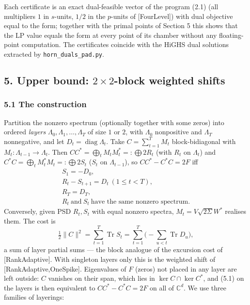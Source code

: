 \documentclass[
  11pt,
  a4paper,
]{article}
\begin{document}
Each certificate is an exact dual-feasible vector of the program (2.1)
(all multipliers \(1\) in \(s\)-units, \(1/2\) in the \(p\)-units of
{[}FourLevel{]}) with dual objective equal to the form; together with
the primal points of Section 5 this shows that the LP value equals the
form at every point of its chamber without any floating-point
computation. The certificates coincide with the HiGHS dual solutions
extracted by {\small\texttt{horn\_\allowbreak{}duals\_\allowbreak{}pad.\allowbreak{}py}}.

\subsection{\texorpdfstring{5. Upper bound: \(2\times2\)-block weighted
shifts}{5. Upper bound: 2\textbackslash times2-block weighted shifts}}\label{upper-bound-2times2-block-weighted-shifts}

\subsubsection{5.1 The construction}\label{the-construction}

Partition the nonzero spectrum (optionally together with some zeros)
into ordered \emph{layers} \(\Lambda_0,\allowbreak{}\Lambda_1,\allowbreak{}\dots,\allowbreak{}\Lambda_T\) of
size \(1\) or \(2\), with \(\Lambda_0\) nonpositive and \(\Lambda_T\)
nonnegative, and let \(D_t=\operatorname{diag}\Lambda_t\). Take
\(C=\sum_{t=1}^TM_t\) block-bidiagonal with
\(M_t:\Lambda_{t-1}\to\Lambda_t\). Then
\(CC^*=\bigoplus_tM_tM_t^*=:\bigoplus 2R_t\) (with \(R_t\) on
\(\Lambda_t\)) and \(C^*C=\bigoplus_tM_t^*M_t=:\bigoplus 2S_t\) (\(S_t\)
on \(\Lambda_{t-1}\)), so \(CC^*-C^*C=2F\) iff
\[\begin{gathered}S_1=-D_0,\\  R_t-S_{t+1}=D_t\ (1\le t<T),\\  R_T=D_T,\\  R_t\ \text{and}\ S_t\ \text{have the same nonzero spectrum}.\end{gathered}\tag{5.1}\]
Conversely, given PSD \(R_t,\allowbreak{}S_t\) with equal nonzero spectra,
\(M_t=V\sqrt{2\Sigma}W^*\) realises them. The cost is
\[\tfrac12\|C\|^2=\sum_{t=1}^T\operatorname{Tr}S_t=\sum_{t=1}^T\Big(-\sum_{u<t}\operatorname{Tr}D_u\Big),\]
a sum of layer partial sums --- the block analogue of the excursion cost
of {[}RankAdaptive{]}. With singleton layers only this is the weighted
shift of {[}RankAdaptive,OneSpike{]}. Eigenvalues of \(F\) (zeros) not
placed in any layer are left outside: \(C\) vanishes on their span,
which lies in \(\ker C\cap\ker C^*\), and (5.1) on the layers is then
equivalent to \(CC^*-C^*C=2F\) on all of \(\mathbb C^d\). We use three
families of layerings:
\end{document}
